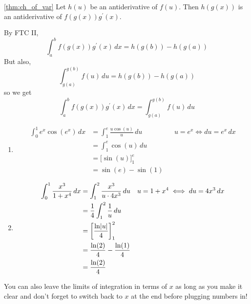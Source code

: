 \begin{Proof}{\ref{thm:ch_of_var}}{}
    Let $ h(u) $ be an antiderivative of $ f(u) $. Then $ h(g(x)) $
    is an antiderivative of $ f(g(x))g^\prime(x) $.

    By FTC II,
    \[ \int_{a}^{b} f(g(x))g^\prime(x)\, d{x} =h(g(b))-h(g(a)) \]
    But also,
    \[ \int_{g(a)}^{g(b)} f(u)\, d{u} =h(g(b))-h(g(a)) \]
    so we get
    \[ \int_{a}^{b} f(g(x))g^\prime(x)\, d{x} =\int_{g(a)}^{g(b)} f(u)\, d{u} \]
\end{Proof}

\begin{Example}{}{}
    \begin{enumerate}[label=(\roman*)]
        \item \begin{align*}
                  \int_{0}^{1} e^x\cos(e^x)\, d{x}
                   & =\int_{1}^{e}\frac{u\cos(u)}{u} \, d{u} &  & u=e^x\iff du=e^x\,dx \\
                   & =\int_{1}^{e} \cos(u)\, d{u}                                      \\
                   & =\bigl[\sin(u)\bigr]_{1}^e                                        \\
                   & =\sin(e)-\sin(1)
              \end{align*}
        \item \begin{align*}
                  \int_{0}^{1} \frac{x^3}{1+x^4} \, d{x}
                   & =\int_{1}^{2} \frac{x^3}{u\cdot4x^3}\, d{u}   &  & u=1+x^4\iff du=4x^3\,dx \\
                   & =\frac{1}{4} \int_{1}^{2} \frac{1}{u} \, d{u}                              \\
                   & =\left[ \frac{\ln\lvert u\rvert}{4}  \right]_{1}^2                                \\
                   & =\frac{\ln(2)}{4} -\frac{\ln(1)}{4}                                        \\
                   & =\frac{\ln(2)}{4}
              \end{align*}
    \end{enumerate}
\end{Example}

\begin{Remark}{}{}
    You can also leave the limits of integration in terms of $ x $ as long as
    you make it clear and don't forget to switch back to $ x $ at the end before
    plugging numbers in!
\end{Remark}

